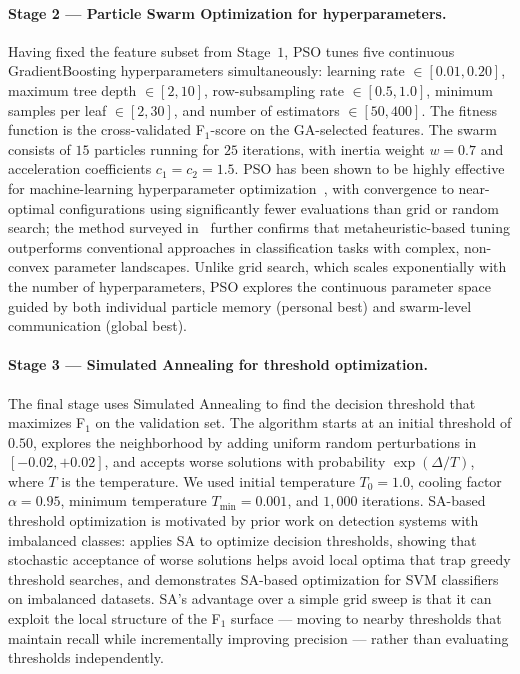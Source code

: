 \documentclass[11pt]{article}
\begin{document}
\paragraph{Stage 2 --- Particle Swarm Optimization for hyperparameters.}
Having fixed the feature subset from Stage~$1$, PSO tunes five continuous GradientBoosting hyperparameters simultaneously: learning rate $\in [0.01, 0.20]$, maximum tree depth $\in [2, 10]$, row-subsampling rate $\in [0.5, 1.0]$, minimum samples per leaf $\in [2, 30]$, and number of estimators $\in [50, 400]$. The fitness function is the cross-validated F$_1$-score on the GA-selected features. The swarm consists of $15$ particles running for $25$ iterations, with inertia weight $w = 0.7$ and acceleration coefficients $c_1 = c_2 = 1.5$. PSO has been shown to be highly effective for machine-learning hyperparameter optimization~\cite{ieee2023pso}, with convergence to near-optimal configurations using significantly fewer evaluations than grid or random search; the method surveyed in~\cite{springer2022softcomputing} further confirms that metaheuristic-based tuning outperforms conventional approaches in classification tasks with complex, non-convex parameter landscapes. Unlike grid search, which scales exponentially with the number of hyperparameters, PSO explores the continuous parameter space guided by both individual particle memory (personal best) and swarm-level communication (global best).

\paragraph{Stage 3 --- Simulated Annealing for threshold optimization.}
The final stage uses Simulated Annealing to find the decision threshold that maximizes F$_1$ on the validation set. The algorithm starts at an initial threshold of $0.50$, explores the neighborhood by adding uniform random perturbations in $[-0.02, +0.02]$, and accepts worse solutions with probability $\exp(\Delta / T)$, where $T$ is the temperature. We used initial temperature $T_0 = 1.0$, cooling factor $\alpha = 0.95$, minimum temperature $T_{\min} = 0.001$, and $1{,}000$ iterations. SA-based threshold optimization is motivated by prior work on detection systems with imbalanced classes: \cite{ieee2015sa} applies SA to optimize decision thresholds, showing that stochastic acceptance of worse solutions helps avoid local optima that trap greedy threshold searches, and \cite{sciencedirect2023sa} demonstrates SA-based optimization for SVM classifiers on imbalanced datasets. SA's advantage over a simple grid sweep is that it can exploit the local structure of the F$_1$ surface --- moving to nearby thresholds that maintain recall while incrementally improving precision --- rather than evaluating thresholds independently.
\end{document}
